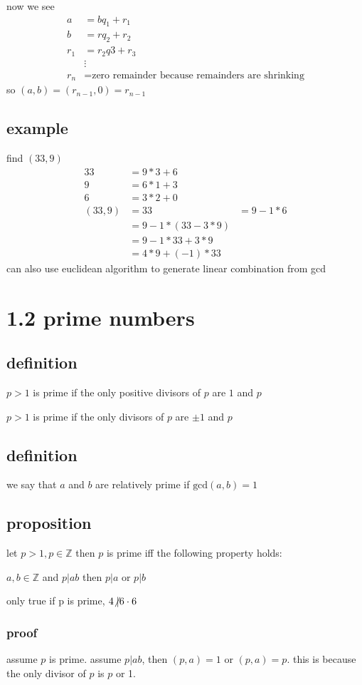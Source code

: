 \documentclass[letterpaper]{article}
\begin{document}
now we see
\begin{align*}
  a&=bq_1+r_1\\
  b&=rq_2+r_2\\
  r_1&=r_2q3+r_3\\
  &\vdots\\
  r_n&=\text{zero remainder because remainders are shrinking}
\end{align*}
so $(a,b)=(r_{n-1},0)=r_{n-1}$
\subsection*{example}
find $(33,9)$
\begin{align*}
  33&=9*3+6\\
  9&=6*1+3\\
  6&=3*2+0\\
  (33,9)&=3
  3&=9-1*6\\
  &=9-1*(33-3*9)\\
  &=9-1*33+3*9\\
  &=4*9+(-1)*33
\end{align*}
can also use euclidean algorithm to generate linear combination from gcd
\section*{1.2 prime numbers}
\subsection*{definition}
$p>1$ is prime if the only positive divisors of $p$ are $1$ and $p$

$p>1$ is prime if the only divisors of $p$ are $\pm1$ and $p$

\subsection*{definition}
we say that $a$ and $b$ are relatively prime if $\text{gcd}(a,b)=1$
\subsection*{proposition}
let $p>1,p\in\mathbb{Z}$ then $p$ is prime iff the following property holds:

$a,b\in\mathbb{Z}$ and $p\vert ab$ then $p\vert a$ or $p\vert b$

only true if p is prime, ${4}{\not\vert}{6\cdot6}$
\subsubsection*{proof}
assume $p$ is prime.  assume $p\vert ab$, then $(p,a)=1$ or $(p,a)=p$. this is because the only divisor of $p$ is $p$ or 1.
\end{document}
